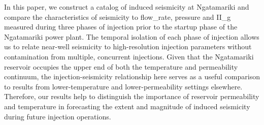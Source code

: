 In this paper, we construct a catalog of induced seismicity at Ngatamariki and compare the characteristics of seismicity to \gls{flow_rate}, pressure and \gls{II_g} measured during three phases of injection prior to the startup phase of the Ngatamariki power plant. The temporal isolation of each phase of injection allows us to relate near-well seismicity to high-resolution injection parameters without contamination from multiple, concurrent injections. Given that the Ngatamariki reservoir occupies the upper end of both the temperature and \gls{permeability} continuum, the injection-seismicity relationship here serves as a useful comparison to results from lower-temperature and lower-permeability settings elsewhere. Therefore, our results help to distinguish the importance of reservoir \gls{permeability} and temperature in forecasting the extent and magnitude of induced seismicity during future injection operations.

